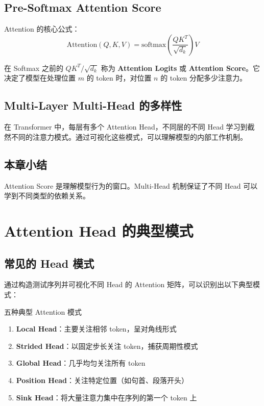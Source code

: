 \documentclass[a4paper]{article}
\begin{document}
\subsection{Pre-Softmax Attention Score}

Attention 的核心公式：
$$
\text{Attention}(Q, K, V) = \text{softmax}\left(\frac{QK^T}{\sqrt{d_k}}\right) V
$$

在 Softmax 之前的 $QK^T / \sqrt{d_k}$ 称为 \textbf{Attention Logits} 或 \textbf{Attention Score}。它决定了模型在处理位置 $m$ 的 token 时，对位置 $n$ 的 token 分配多少注意力。

\subsection{Multi-Layer Multi-Head 的多样性}

在 Transformer 中，每层有多个 Attention Head，不同层的不同 Head 学习到截然不同的注意力模式。通过可视化这些模式，可以理解模型的内部工作机制。

\subsection{本章小结}

Attention Score 是理解模型行为的窗口。Multi-Head 机制保证了不同 Head 可以学到不同类型的依赖关系。

\section{Attention Head 的典型模式}

\subsection{常见的 Head 模式}

通过构造测试序列并可视化不同 Head 的 Attention 矩阵，可以识别出以下典型模式：

\begin{importantbox}{五种典型 Attention 模式}
\begin{enumerate}
  \item \textbf{Local Head}：主要关注相邻 token，呈对角线形式
  \item \textbf{Strided Head}：以固定步长关注 token，捕获周期性模式
  \item \textbf{Global Head}：几乎均匀关注所有 token
  \item \textbf{Position Head}：关注特定位置（如句首、段落开头）
  \item \textbf{Sink Head}：将大量注意力集中在序列的第一个 token 上
\end{enumerate}
\end{importantbox}
\end{document}
